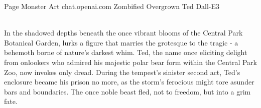 %
	{Page \thepage}%
	{Monster Art}%
	{chat.openai.com}%
	{Zombified Overgrown Ted}%
	{Dall-E3}%
	
\vspace*{4.75cm}\hfill\\
In the shadowed depths beneath the once vibrant blooms of the Central Park Botanical Garden, lurks a figure that marries the grotesque to the tragic - a behemoth borne of nature's darkest whim. Ted, the name once eliciting delight from onlookers who admired his majestic polar bear form within the Central Park Zoo, now invokes only dread. During the tempest's sinister second act, Ted's enclosure became his prison no more, as the storm's ferocious might tore asunder bars and boundaries. The once noble beast fled, not to freedom, but into a grim fate.

